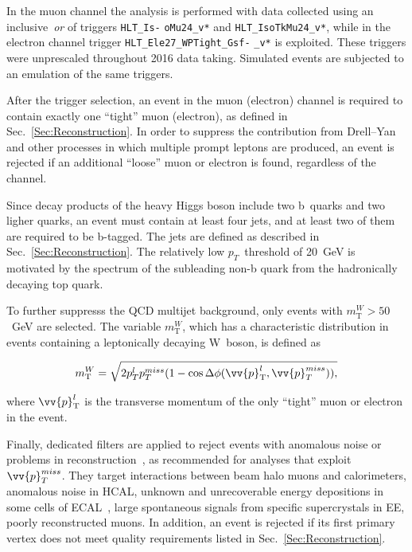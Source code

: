 In the muon channel the analysis is performed with data collected using an inclusive~\textit{or} of triggers \texttt{HLT\_Is-} \texttt{oMu24\_v*} and \texttt{HLT\_IsoTkMu24\_v*}, while in the electron channel trigger \texttt{HLT\_Ele27\_WPTight\_Gsf-} \texttt{\_v*} is exploited.
These triggers were unprescaled throughout 2016 data taking.
Simulated events are subjected to an emulation of the same triggers.

After the trigger selection, an event in the muon (electron) channel is required to contain exactly one ``tight'' muon (electron), as defined in Sec.~\ref{Sec:Reconstruction}.
In order to suppress the contribution from Drell--Yan and other processes in which multiple prompt leptons are produced, an event is rejected if an additional ``loose'' muon or electron is found, regardless of the channel.

Since decay products of the heavy Higgs boson include two b~quarks and two ligher quarks, an event must contain at least four jets, and at least two of them are required to be b-tagged.
The jets are defined as described in Sec.~\ref{Sec:Reconstruction}.
The relatively low $p_{T}$~threshold of 20~GeV is motivated by the spectrum of the subleading non-b quark from the hadronically decaying top quark.

To further suppresss the QCD multijet background, only events with $m_\text{T}^W > 50$~GeV are selected.
The variable $m_\text{T}^W$, which has a characteristic distribution in events containing a leptonically decaying W~boson, is defined as
\begin{linenomath}
\begin{equation}
  m_\text{T}^W = \sqrt{2p_{T}^l p_{T}^{miss} (1 - \cos\Delta\phi(\vv{p}_\text{T}^l, \vv{p}_{T}^{miss})),}
  \label{Eq:MtW}
\end{equation}
\end{linenomath}
where $\vv{p}_\text{T}^l$ is the transverse momentum of the only ``tight'' muon or electron in the event.

Finally, dedicated filters are applied to reject events with anomalous noise or problems in reconstruction~\cite{Wiki:METFilters}, as recommended for analyses that exploit $\vv{p}_{T}^{miss}$.
They target interactions between beam halo muons and calorimeters, anomalous noise in HCAL, unknown and unrecoverable energy depositions in some cells of ECAL~\cite{Talk:ECALTPFilter}, large spontaneous signals from specific supercrystals in EE, poorly reconstructed muons.
In addition, an event is rejected if its first primary vertex does not meet quality requirements listed in Sec.~\ref{Sec:Reconstruction}.

